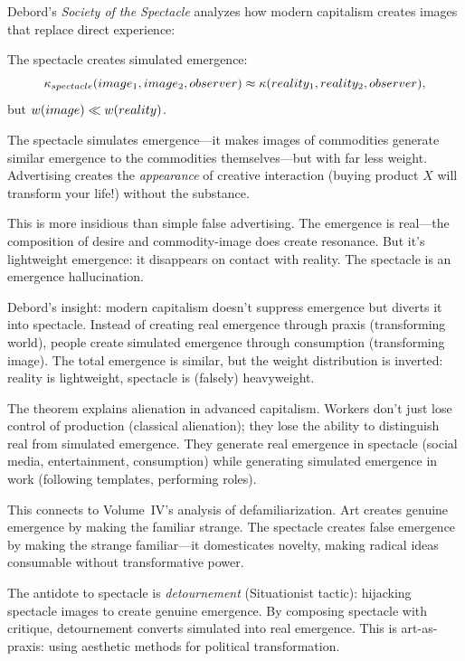 Debord's \emph{Society of the Spectacle} analyzes how modern capitalism creates
images that replace direct experience:

\begin{theorem}
\label{thm:spectacle}
The spectacle creates simulated emergence:
\[
  \kappa_{spectacle}(image_1, image_2, observer) \approx
  \kappa(reality_1, reality_2, observer),
\]
but $w(image) \ll w(reality)$.
\end{theorem}

\begin{interpretation}
The spectacle simulates emergence---it makes images of commodities generate
similar emergence to the commodities themselves---but with far less weight.
Advertising creates the \emph{appearance} of creative interaction (buying
product $X$ will transform your life!) without the substance.

This is more insidious than simple false advertising. The emergence is real---the
composition of desire and commodity-image does create resonance. But it's
lightweight emergence: it disappears on contact with reality. The spectacle is
an emergence hallucination.

Debord's insight: modern capitalism doesn't suppress emergence but diverts it
into spectacle. Instead of creating real emergence through praxis (transforming
world), people create simulated emergence through consumption (transforming
image). The total emergence is similar, but the weight distribution is inverted:
reality is lightweight, spectacle is (falsely) heavyweight.

The theorem explains alienation in advanced capitalism. Workers don't just lose
control of production (classical alienation); they lose the ability to distinguish
real from simulated emergence. They generate real emergence in spectacle
(social media, entertainment, consumption) while generating simulated emergence
in work (following templates, performing roles).

This connects to Volume~IV's analysis of defamiliarization. Art creates genuine
emergence by making the familiar strange. The spectacle creates false emergence
by making the strange familiar---it domesticates novelty, making radical ideas
consumable without transformative power.

The antidote to spectacle is \emph{detournement} (Situationist tactic): hijacking
spectacle images to create genuine emergence. By composing spectacle with
critique, detournement converts simulated into real emergence. This is
art-as-praxis: using aesthetic methods for political transformation.
\end{interpretation}

